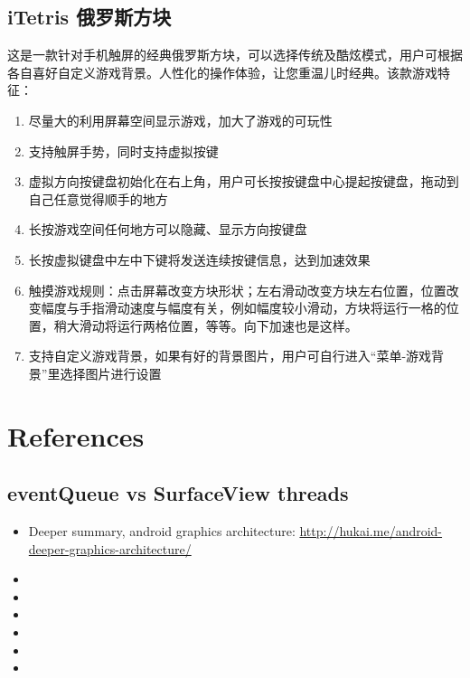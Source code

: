 \documentclass[9pt,b5paper]{article}
\begin{document}
\subsection{iTetris 俄罗斯方块}
\label{sec-2-1}
这是一款针对手机触屏的经典俄罗斯方块，可以选择传统及酷炫模式，用户可根据各自喜好自定义游戏背景。人性化的操作体验，让您重温儿时经典。该款游戏特征：

\begin{enumerate}
\item 尽量大的利用屏幕空间显示游戏，加大了游戏的可玩性
\item 支持触屏手势，同时支持虚拟按键
\item 虚拟方向按键盘初始化在右上角，用户可长按按键盘中心提起按键盘，拖动到自己任意觉得顺手的地方
\item 长按游戏空间任何地方可以隐藏、显示方向按键盘
\item 长按虚拟键盘中左中下键将发送连续按键信息，达到加速效果
\item 触摸游戏规则：点击屏幕改变方块形状；左右滑动改变方块左右位置，位置改变幅度与手指滑动速度与幅度有关，例如幅度较小滑动，方块将运行一格的位置，稍大滑动将运行两格位置，等等。向下加速也是这样。
\item 支持自定义游戏背景，如果有好的背景图片，用户可自行进入“菜单-游戏背景”里选择图片进行设置
\end{enumerate}

\section{References}
\label{sec-3}
\subsection{eventQueue vs SurfaceView threads}
\label{sec-3-1}
\begin{itemize}
\item Deeper summary, android graphics architecture: \url{http://hukai.me/android-deeper-graphics-architecture/}
\item 
\item 
\item 
\item 
\item 
\item 
\end{itemize}
\end{document}
